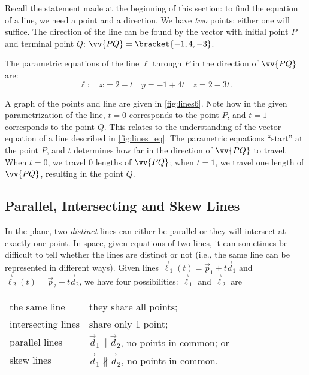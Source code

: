 {Recall the statement made at the beginning of this section: to find the equation of a line, we need a point and a direction. We have \emph{two} points; either one will suffice. The direction of the line can be found by the vector with initial point $P$ and terminal point $Q$: $\vv{PQ} =\bracket{-1,4,-3}$.

The parametric equations of the line $\ell$ through $P$ in the direction of $\vv{PQ}$ are:
\[\ell: \quad x= 2-t\quad y=-1+4t \quad z=2-3t.\]


A graph of the points and line are given in \autoref{fig:lines6}. Note how in the given parametrization of the line, $t=0$ corresponds to the point $P$, and $t=1$ corresponds to the point $Q$. This relates to the understanding of the vector equation of a line described in \autoref{fig:lines_eq}. The parametric equations ``start'' at the point $P$, and $t$ determines how far in the direction of $\vv{PQ}$ to travel. When $t=0$, we travel 0 lengths of $\vv{PQ}$; when $t=1$, we travel one length of $\vv{PQ}$, resulting in the point $Q$.}

\subsection{Parallel, Intersecting and Skew Lines}

In the plane, two \emph{distinct} lines can either be parallel or they will intersect at exactly one point. In space, given equations of two lines, it can sometimes be difficult to tell whether the lines are distinct or not (i.e., the same line can be represented in different ways). Given lines $\vec\ell_1(t) = \vec p_1 + t\vec d_1$ and $\vec \ell_2(t) = \vec p_2+t\vec d_2$, we have four possibilities: $\vec \ell_1$ and $\vec \ell_2$ are
\begin{center}
\begin{tabular}{p{100pt}p{150pt}}
the same line & they share all points; \\
intersecting lines & share only 1 point;\\
parallel lines & $\vec d_1\parallel \vec d_2$, no points in common; or \\
skew lines & $\vec d_1\nparallel \vec d_2$, no points in common. 
\end{tabular}
\end{center}

